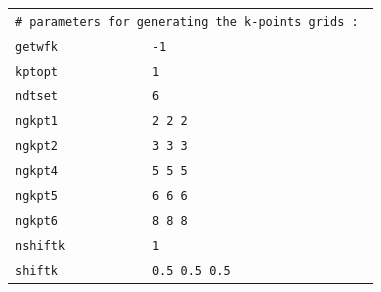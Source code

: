 \documentclass[11pt,a4paper]{article}
\begin{document}
\begin{center}
\begin{tabular}{lll}
\multicolumn{3}{l}{\texttt{\# parameters for generating the k-points grids : }}\\
\texttt{getwfk} & \texttt{-1}&\\
\texttt{kptopt} & \texttt{1} &\\
\texttt{ndtset} & \texttt{6}&\\
\texttt{ngkpt1} & \texttt{2 2 2}&\\
\texttt{ngkpt2} & \texttt{3 3 3}&\\
\texttt{ngkpt4} & \texttt{5 5 5}&\\
\texttt{ngkpt5} & \texttt{6 6 6}&\\
\texttt{ngkpt6} & \texttt{8 8 8}&\\
\texttt{nshiftk} &\texttt{1}&\\
\texttt{shiftk} &\texttt{0.5 0.5 0.5}&
\end{tabular}
\end{center} 
\end{document}
